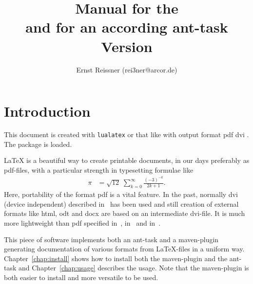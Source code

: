 \documentclass[12pt]{book}
\title{Manual for the \artifactId{} \protect\\
  and for an according ant-task \protect\\
Version \strippedVersionID}
\author{Ernst Reissner (rei3ner@arcor.de)}
\date{\versionDate}
\newcommand{\gls}[1]{#1}
\renewcommand{\lstlistoflistings}{\begingroup
\tocfile{\lstlistingname}{lol}
\endgroup}
\renewcommand{\lstlistoflistings}{\begingroup
\tocfile{List of \lstlistingname{}s}{lol}
\endgroup}
\begin{document}
\maketitle

\tableofcontents
\listoffigures
\listoftables
\lstlistoflistings


\chapter{Introduction}

This document is created with \texttt{lualatex} or that like 
with output format 
\ifpdf%
pdf%
\else
dvi%
\fi.
The package  
is  loaded. 

\LaTeX{} is a beautiful way to create printable documents, 
in our days preferably as \gls{pdf}-files, 
with a particular strength in typesetting formulae like
%
%
\begin{align}
\pi & = \sqrt{12}\;\sum^\infty_{k=0} \frac{(-3)^{-k}}{2k+1}. %
\end{align}
%
Here, portability of the format \gls{pdf} is a vital feature. 
In the past, normally \gls{dvi} (device independent)
described in~\cite{DviF} has been used 
and still creation of external formats like \gls{html}, 
\gls{odt} and \gls{docx} are based on an intermediate \gls{dvi}-file.
It is much more lightweight than pdf specified in~\cite{Pdf1}, in~\cite{Pdf2}
and in~\cite{Pdf3}.

This piece of software implements both an ant-task and a maven-plugin 
generating documentation of various formats from \LaTeX-files 
in a uniform way. 
Chapter~\ref{chap:install} shows how to install both the maven-plugin 
and the ant-task 
and Chapter~\ref{chap:usage} describes the usage. 
Note that the maven-plugin is both easier to install 
and more versatile to be used. 
\end{document}
